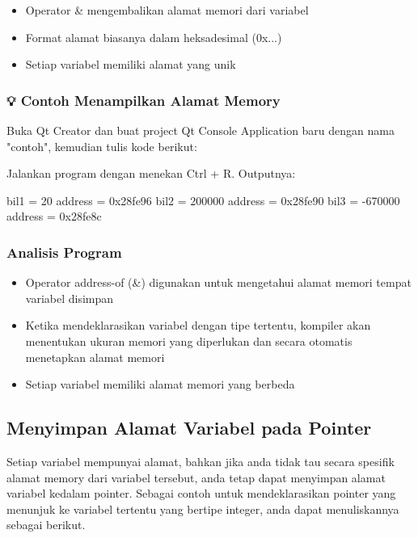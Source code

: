 \begin{itemize}
\item Operator \& mengembalikan alamat memori dari variabel
\item Format alamat biasanya dalam heksadesimal (0x...)
\item Setiap variabel memiliki alamat yang unik
\end{itemize}

\subsubsection*{💡 Contoh Menampilkan Alamat Memory}

Buka Qt Creator dan buat project Qt Console Application baru dengan nama "contoh", kemudian tulis kode berikut:



Jalankan program dengan menekan Ctrl + R. Outputnya:

\begin{lcverbatim}
bil1 = 20 address = 0x28fe96 
bil2 = 200000 address = 0x28fe90 
bil3 = -670000 address = 0x28fe8c
\end{lcverbatim}

\subsubsection*{Analisis Program}

\begin{itemize}
\item Operator address-of (\&) digunakan untuk mengetahui alamat memori tempat variabel disimpan
\item Ketika mendeklarasikan variabel dengan tipe tertentu, kompiler akan menentukan ukuran memori yang diperlukan dan secara otomatis menetapkan alamat memori
\item Setiap variabel memiliki alamat memori yang berbeda
\end{itemize}

\subsection{Menyimpan Alamat Variabel pada Pointer}\label{menyimpan-alamat-variabel-pada-pointer}

Setiap variabel mempunyai alamat, bahkan jika anda tidak tau secara
spesifik alamat memory dari variabel tersebut, anda tetap dapat
menyimpan alamat variabel kedalam pointer. Sebagai contoh untuk
mendeklarasikan pointer yang menunjuk ke variabel tertentu yang bertipe
integer, anda dapat menuliskannya sebagai berikut.

